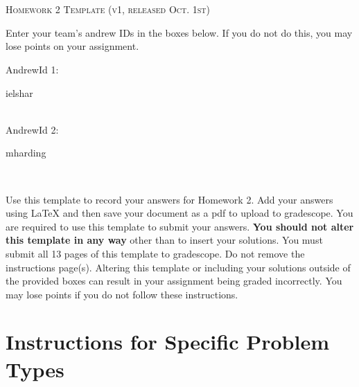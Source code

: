 \documentclass[12pt]{article}
\begin{document}
\section*{}
\begin{center}
  \centerline{\textsc{\LARGE  Homework 2 Template (v1, released Oct. 1st)}}
\end{center}

Enter your team's andrew IDs in the boxes below.  If you do not do this, you may lose points on your assignment.

AndrewId 1: \begin{tcolorbox}[fit,height=1cm, width=5cm, blank, borderline={1pt}{1pt},nobeforeafter]
    \begin{center}
    \vspace{3mm}
    ielshar
    \end{center}
\end{tcolorbox}
    \\
AndrewId 2: \begin{tcolorbox}[fit,height=1cm, width=5cm, blank, borderline={1pt}{1pt},nobeforeafter]
    \begin{center}
    \vspace{3mm}
    mharding
    \end{center}
\end{tcolorbox} \\
\vspace{0.5cm}

Use this template to record your answers for Homework 2.  Add your answers using LaTeX and then save your document as a pdf to upload to gradescope.  You are required to use this template to submit your answers.  \textbf{You should not alter this template in any way} other than to insert your solutions.  You must submit all 13 pages of this template to gradescope.  Do not remove the instructions page(s).  Altering this template or including your solutions outside of the provided boxes can result in your assignment being graded incorrectly.  You may lose points if you do not follow these instructions.

\section*{Instructions for Specific Problem Types}


\end{document}
